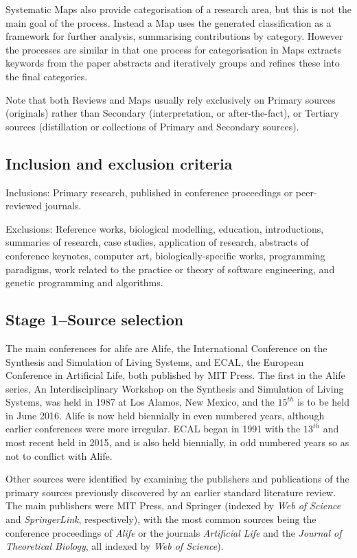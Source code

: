 Systematic Maps also provide categorisation of a research area, but this is not the main goal of the process. Instead a Map uses the generated classification as a framework for further analysis, summarising contributions by category. However the processes are similar in that one process for categorisation in Maps \parencite{Petersen:2008fk} extracts keywords from the paper abstracts and iteratively groups and refines these into the final categories.

Note that both Reviews and Maps usually rely exclusively on Primary sources (originals) rather than Secondary (interpretation, or after-the-fact), or Tertiary sources (distillation or collections of Primary and Secondary sources).

\subsection{Inclusion and exclusion criteria}
Inclusions: Primary research, published in conference proceedings or peer-reviewed journals.

Exclusions: Reference works, biological modelling, education, introductions, summaries of research, case studies, application of research, abstracts of conference keynotes, computer art, biologically-specific works, programming paradigms, work related to the practice or theory of software engineering, and genetic programming and algorithms.

\subsection{Stage 1--Source selection}
The main conferences for \gls{alife} are Alife, the International Conference on the Synthesis and Simulation of Living Systems, and ECAL, the European Conference in Artificial Life, both published by MIT Press. The first in the Alife series, An Interdisciplinary Workshop on the Synthesis and Simulation of Living Systems, was held in 1987 at Los Alamos, New Mexico, and the $15^{th}$ is to be held in June 2016. Alife is now held biennially in even numbered years, although earlier conferences were more irregular. ECAL began  in 1991 with the $13^{th}$ and most recent held in 2015, and is also held biennially, in odd numbered years so as not to conflict with Alife.

Other sources were identified by examining the publishers and publications of the primary sources previously discovered by an earlier standard literature review. The main publishers were MIT Press, and Springer (indexed by \emph{Web of Science} and \emph{SpringerLink}, respectively), with the most common sources being the conference proceedings of \emph{Alife} or the journals \emph{Artificial Life} and the \emph{Journal of Theoretical Biology}, all indexed by \emph{Web of Science}).

